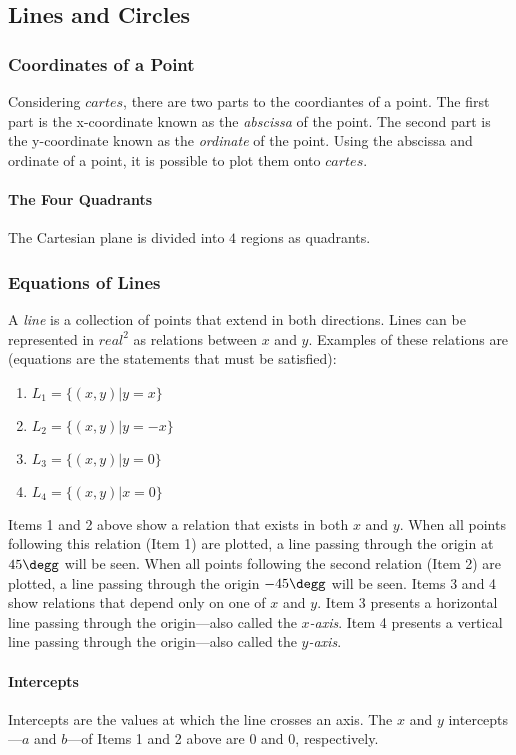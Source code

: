 \subsection{Lines and Circles}

\subsubsection{Coordinates of a Point}
Considering $cartes$, there are two parts to the coordiantes of a point.
The first part is the x-coordinate known as the \emph{abscissa} of the point.
The second part is the y-coordinate known as the \emph{ordinate} of the point.
Using the abscissa and ordinate of a point, it is possible to plot them onto $cartes$.

\paragraph{The Four Quadrants}
The Cartesian plane is divided into $4$ regions as quadrants.

\subsubsection{Equations of Lines}
A \emph{line} is a collection of points that extend in both directions.
Lines can be represented in $real ^2$ as relations between $x$ and $y$.
Examples of these relations are (equations are the statements that must be satisfied):
\begin{enumerate}
  \item $L_1 = \{(x, y) | y = x\}$
  \item $L_2 = \{(x, y) | y = -x\}$
  \item $L_3 = \{(x, y) | y = 0\}$
  \item $L_4 = \{(x, y) | x = 0\}$
\end{enumerate}

Items 1 and 2 above show a relation that exists in both $x$ and $y$.
When all points following this relation (Item 1) are plotted, a line passing through the origin at $45\degg$ will be seen.
When all points following the second relation (Item 2) are plotted, a line passing through the origin $-45\degg$ will be seen.
Items 3 and 4 show relations that depend only on one of $x$ and $y$.
Item 3 presents a horizontal line passing through the origin---also called the \emph{$x$-axis}.
Item 4 presents a vertical line passing through the origin---also called the \emph{$y$-axis}.

\paragraph{Intercepts}
Intercepts are the values at which the line crosses an axis.
The $x$ and $y$ intercepts---$a$ and $b$---of Items 1 and 2 above are $0$ and $0$, respectively.

